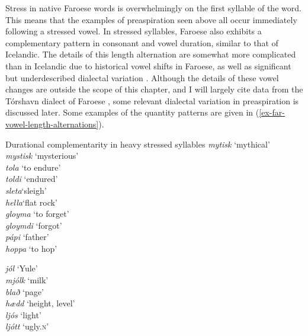 \documentclass[output=paper,colorlinks,citecolor=brown]{langscibook}
\begin{document}
Stress in native Faroese words is overwhelmingly on the first syllable of the word. This means that the examples of preaspiration seen above all occur immediately following a stressed vowel. In stressed syllables, Faroese also exhibits a complementary pattern in consonant and vowel duration, similar to that of Icelandic. The details of this length alternation are somewhat more complicated than in Icelandic due to historical vowel shifts in Faroese, as well as significant but underdescribed dialectal variation \citep{lockwood1955,oneil1964,cathey1997}. Although the details of these vowel changes are outside the scope of this chapter, and I will largely cite data from the Tórshavn dialect of Faroese \citep{arnason2011}, some relevant dialectal variation in preaspiration is discussed later. Some examples of the quantity patterns are given in (\ref{ex-far-vowel-length-alternations}). 

\ea Durational complementarity in heavy stressed syllables \citep{arnason2011}
\label{ex-far-vowel-length-alternations}
\ea	 
\ea \textit{mytisk} \tab{}  \tab `mythical'\\ 
     \textit{mystisk} \tab{}  \tab `mysterious'\\
	 \ex \textit{tola} \tab\relax [tʰoː.la]   \tab `to endure'\\	
	 \textit{toldi} \tab\relax [tɔl.tɪ]    \tab `endured'\\
	 \ex \textit{sleta}\tab\relax [stleː.ta]  \tab `sleigh'\\	
	 \textit{hella}\tab\relax [hɛt.la]    \tab `flat rock'\\
	 \ex \textit{gloyma} \tab\relax [klɔiː.ma]	\tab `to forget'\\ 	
	 \textit{gloymdi} \tab\relax [klɔim.tɪ]  \tab `forgot'\\
	 \ex \textit{pápi} \tab\relax [pʰɔɑː.pɪ] 	\tab `father'\\	
	 \textit{hoppa} \tab\relax [hɔhp.pa]	\tab `to hop'
     \z
	
\ex	 
\ea \textit{jól}   \tab\relax [jɔuːl]	\tab `Yule'\\	
	 \textit{mjólk} \tab\relax [mjœl̥k]	\tab `milk'\\
	 \ex \textit{blað}	\tab\relax [plɛaː]	\tab `page'\\  
	 \textit{hædd}  \tab\relax [hatː]   \tab `height, level'\\
	 \ex \textit{ljós}  \tab\relax [ʎɔuːs]	\tab `light'\\
	 \textit{ljótt} \tab\relax [ʎœhtː]  \tab `ugly.\textsc{n}'
     \z
	 \z
\z
\end{document}
